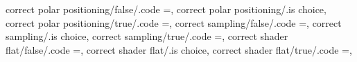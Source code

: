correct polar positioning/false/.code                              ={\def\b@pgfplots@polaraxis@fix@positioning{0}},                                                                                    
correct polar positioning/.is choice,
correct polar positioning/true/.code                               ={\def\b@pgfplots@polaraxis@fix@positioning{1}},                                                                                    
correct sampling/false/.code                                       ={\let\pgfplotsforeachungroupeduniform@loop@mathengine                                                                              =\pgfplotsforeachungroupeduniform@loop@mathengine@legacy}, 
correct sampling/.is choice,
correct sampling/true/.code                                        ={\let\pgfplotsforeachungroupeduniform@loop@mathengine                                                                              =\pgfplotsforeachungroupeduniform@loop@mathengine@precise},
correct shader flat/false/.code                                    ={\def\b@pgfplots@correct@shader@flat{0}},                                                                                          
correct shader flat/.is choice,
correct shader flat/true/.code                                     ={\def\b@pgfplots@correct@shader@flat{1}},                                                                                          


